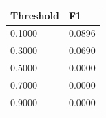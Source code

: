 \begin{tabular}{ll}
\toprule
Threshold & F1 \\
\midrule
0.1000 & 0.0896 \\
0.3000 & 0.0690 \\
0.5000 & 0.0000 \\
0.7000 & 0.0000 \\
0.9000 & 0.0000 \\
\bottomrule
\end{tabular}